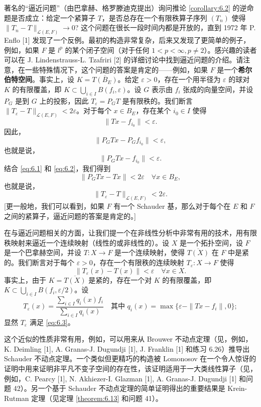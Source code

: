 \begin{remark}\label{remark:6.1}
著名的“逼近问题”（由巴拿赫、格罗滕迪克提出）询问推论 \ref{corollary:6.2} 的逆命题是否成立：给定一个紧算子 \(T\)，是否总存在一个有限秩算子序列 \((T_n)\) 使得 \(\|T_n - T\|_{\mathcal{L}(E, F)} \to 0\)? 这个问题在很长一段时间内都是开放的，直到 1972 年 P. Enflo [1] 发现了一个反例。最初的构造非常复杂，后来又发现了更简单的例子，例如，如果 \(F\) 是 \(l^p\) 的某个闭子空间（对于任何 \(1 < p < \infty, p \ne 2\)）。感兴趣的读者可以在 J. Lindenstrauss-L. Tzafriri [2] 的详细讨论中找到逼近问题的介绍。请注意，在一些特殊情况下，这个问题的答案是肯定的——例如，如果 \(F\) 是一个\textbf{希尔伯特空间}。事实上，设 \(K = \overline{T(B_E)}\)。给定 \(\varepsilon > 0\)，存在一个用半径为 \(\varepsilon\) 的球对 \(K\) 的有限覆盖，即 \(K \subset \bigcup_{i \in I} B(f_i, \varepsilon)\)。设 \(G\) 表示由 \(f_i\) 张成的向量空间，并设 \(P_G\) 是到 \(G\) 上的投影，因此 \(T_\varepsilon = P_G T\) 是有限秩的。我们断言 \(\|T_\varepsilon - T\|_{\mathcal{L}(E, F)} < 2\varepsilon\)。对于每个 \(x \in B_E\)，存在某个 \(i_0 \in I\) 使得
\begin{equation}\label{eq:6.1}
\|Tx - f_{i_0}\| < \varepsilon.
\end{equation}
因此，
\[
\|P_G Tx - P_G f_{i_0}\| < \varepsilon,
\]
也就是说，
\begin{equation}\label{eq:6.2}
\|P_G Tx - f_{i_0}\| < \varepsilon.
\end{equation}
结合 \eqref{eq:6.1} 和 \eqref{eq:6.2}，我们得到
\[
\|P_G Tx - Tx\| < 2\varepsilon \quad \forall x \in B_E,
\]
也就是说，
\[
\|T_\varepsilon - T\|_{\mathcal{L}(E, F)} < 2\varepsilon.
\]
[更一般地，我们可以看到，如果 \(F\) 有一个 Schauder 基，那么对于每个在 \(E\) 和 \(F\) 之间的紧算子，逼近问题的答案是肯定的。]

在与逼近问题相关的方面，让我们提一个在非线性分析中非常有用的技术，用有限秩映射来逼近一个连续映射（线性的或非线性的）。设 \(X\) 是一个拓扑空间，设 \(F\) 是一个巴拿赫空间，并设 \(T: X \to F\) 是一个连续映射，使得 \(\overline{T(X)}\) 在 \(F\) 中是紧的。我们断言对于每个 \(\varepsilon > 0\)，存在一个有限秩的连续映射 \(T_\varepsilon: X \to F\) 使得
\begin{equation}\label{eq:6.3}
\|T_\varepsilon(x) - T(x)\| < \varepsilon \quad \forall x \in X.
\end{equation}
事实上，由于 \(K = \overline{T(X)}\) 是紧的，存在一个对 \(K\) 的有限覆盖，即 \(K \subset \bigcup_{i \in I} B(f_i, \varepsilon/2)\)。设
\[
T_\varepsilon(x) = \frac{\sum_{i \in I} q_i(x) f_i}{\sum_{i \in I} q_i(x)} \quad \text{其中 } q_i(x) = \max\{\varepsilon - \|Tx - f_i\|, 0\};
\]
显然 \(T_\varepsilon\) 满足 \eqref{eq:6.3}。

这个近似的性质非常有用，例如，可以用来从 Brouwer 不动点定理（见，例如，K. Deimling [1], A. Granas-J. Dugundji [1], J. Franklin [1] 和练习 6.26）推导出 Schauder 不动点定理。一个类似但更精巧的构造被 Lomonosov 在一个令人惊讶的证明中用来证明非平凡不变子空间的存在性，该证明适用于一大类线性算子（见，例如，C. Pearcy [1], N. Akhiezer-I. Glazman [1], A. Granas-J. Dugundji [1] 和问题 42）。另一个基于 Schauder 不动点定理的简单证明得出的重要结果是 Krein-Rutman 定理（见定理 \ref{theorem:6.13} 和问题 41）。
\end{remark}

